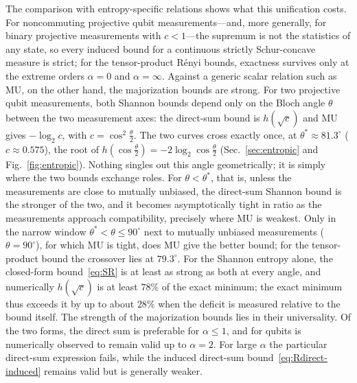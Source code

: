 \documentclass[aps,pra,twocolumn,superscriptaddress,nofootinbib,floatfix]{revtex4-2}
\theoremstyle{definition}
\newcommand{\sqc}{\sqrt{c}}
\begin{document}
The comparison with entropy-specific relations shows what this unification
costs. For noncommuting projective qubit measurements---and, more generally, for
binary projective measurements with $c<1$---the supremum is not the statistics of
any state, so every induced bound for a continuous strictly Schur-concave measure
is strict; for the tensor-product R\'enyi bounds, exactness survives only at the
extreme orders $\alpha=0$ and $\alpha=\infty$. Against a generic scalar relation
such as MU,
on the other hand, the majorization bounds are strong. For two projective qubit
measurements, both Shannon bounds depend only on the Bloch angle $\theta$
between the two measurement axes: the direct-sum bound is $h(\sqc)$ and MU
gives $-\log_2c$, with $c=\cos^2\frac\theta2$. The two curves cross exactly
once, at $\theta^\ast\approx81.3^\circ$ ($c\approx0.575$), the root of
$h(\cos\frac\theta2)=-2\log_2\cos\frac\theta2$ (Sec.~\ref{sec:entropic} and
Fig.~\ref{fig:entropic}). Nothing singles out this angle geometrically; it is
simply where the two bounds exchange roles. For $\theta<\theta^\ast$, that is,
unless the measurements are close to mutually unbiased, the direct-sum Shannon
bound is the stronger of the two, and it becomes asymptotically tight in ratio
as the measurements approach compatibility, precisely where MU is weakest.
Only in the narrow window $\theta^\ast<\theta\le90^\circ$ next to mutually
unbiased measurements ($\theta=90^\circ$), for which MU is tight, does MU give
the better bound; for the tensor-product bound the crossover lies at
$79.3^\circ$. For the Shannon entropy alone, the closed-form
bound~\eqref{eq:SR} is at least as strong as both at every angle, and
numerically $h(\sqc)$ is at least $78\%$ of the exact minimum; the exact minimum thus
exceeds it by up to about $28\%$ when the deficit is measured relative to the
bound itself. The strength of the majorization bounds lies in their
universality. Of the two forms, the direct sum is
preferable for $\alpha\le1$, and for qubits is numerically observed to remain
valid up to $\alpha=2$. For large $\alpha$ the particular direct-sum expression
fails, while the induced direct-sum bound~\eqref{eq:Rdirect-induced} remains
valid but is generally weaker.
\end{document}
